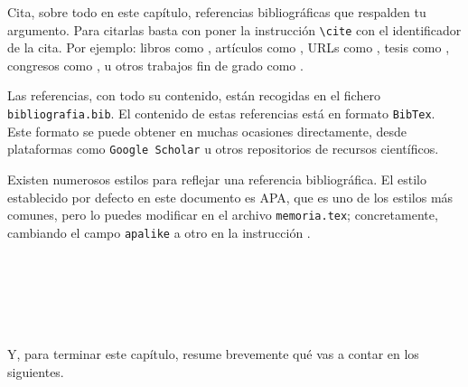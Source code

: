 Cita, sobre todo en este capítulo, referencias bibliográficas que respalden tu argumento. Para citarlas basta con poner la instrucción \verb|\cite| con el identificador de la cita. Por ejemplo: libros como \cite{vega12e}, artículos como \cite{vega19b}, URLs como \cite{vega19a}, tesis como \cite{vega18b}, congresos como \cite{vega18a}, u otros trabajos fin de grado como \cite{vega08b}.

Las referencias, con todo su contenido, están recogidas en el fichero \texttt{bibliografia.bib}. El contenido de estas referencias está en formato \texttt{BibTex}. Este formato se puede obtener en muchas ocasiones directamente, desde plataformas como \texttt{Google Scholar} u otros repositorios de recursos científicos.

Existen numerosos estilos para reflejar una referencia bibliográfica. El estilo establecido por defecto en este documento es APA, que es uno de los estilos más comunes, pero lo puedes modificar en el archivo \texttt{memoria.tex}; concretamente, cambiando el campo \verb|apalike| a otro en la instrucción \verb||. 

\

\

\

Y, para terminar este capítulo, resume brevemente qué vas a contar en los siguientes.
